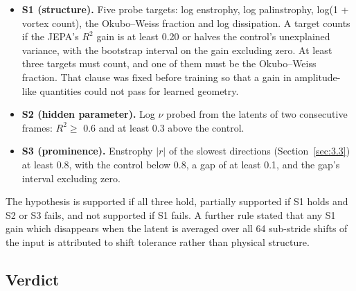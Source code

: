 \documentclass[10pt]{article}
\begin{document}
\begin{itemize}
\item \textbf{S1 (structure).} Five probe targets: log enstrophy, log palinstrophy, log(1 + vortex count), the Okubo--Weiss fraction and log dissipation. A target counts if the JEPA's $R^2$ gain is at least 0.20 or halves the control's unexplained variance, with the bootstrap interval on the gain excluding zero. At least three targets must count, and one of them must be the Okubo--Weiss fraction. That clause was fixed before training so that a gain in amplitude-like quantities could not pass for learned geometry.
\item \textbf{S2 (hidden parameter).} Log $\nu$ probed from the latents of two consecutive frames: $R^2 \geq$ 0.6 and at least 0.3 above the control.
\item \textbf{S3 (prominence).} Enstrophy $|r|$ of the slowest directions (Section~\ref{sec:3.3}) at least 0.8, with the control below 0.8, a gap of at least 0.1, and the gap's interval excluding zero.
\end{itemize}

The hypothesis is supported if all three hold, partially supported if S1 holds and S2 or S3 fails, and not supported if S1 fails. A further rule stated that any S1 gain which disappears when the latent is averaged over all 64 sub-stride shifts of the input is attributed to shift tolerance rather than physical structure.

\subsection{Verdict}\label{sec:4.3}
\end{document}
